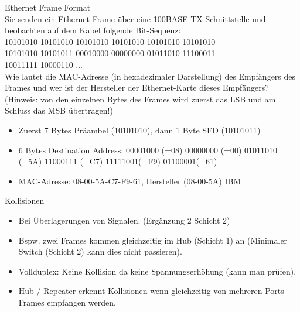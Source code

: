\begin{example2}{Ethernet Frame Format}\\
    Sie senden ein Ethernet Frame über eine 100BASE-TX Schnittstelle und beobachten auf dem Kabel folgende Bit-Sequenz:\\
    10101010 10101010 10101010 10101010 10101010 10101010\\
    10101010 10101011 00010000 00000000 01011010 11100011\\
    10011111 10000110 ...\\
    Wie lautet die MAC-Adresse (in hexadezimaler Darstellung) des Empfängers des Frames und
    wer ist der Hersteller der Ethernet-Karte dieses Empfängers?
    (Hinweis: von den einzelnen Bytes des Frames wird zuerst das LSB und am Schluss das
    MSB übertragen!)
    \begin{itemize}
        \item Zuerst 7 Bytes Präambel (10101010), dann 1 Byte SFD (10101011)
        \item 6 Bytes Destination Address: 00001000 (=08) 00000000 (=00) 01011010 (=5A) 11000111 (=C7) 11111001(=F9) 01100001(=61)
        \item MAC-Adresse: 08-00-5A-C7-F9-61, Hersteller (08-00-5A) IBM
    \end{itemize}
\end{example2}

\begin{definition}{Kollisionen}
    \begin{itemize}
        \item Bei Überlagerungen von Signalen. (Ergänzung 2 Schicht 2)
        \item Bspw. zwei Frames kommen gleichzeitig im Hub (Schicht 1) an (Minimaler Switch (Schicht 2) kann dies nicht passieren).
        \item Vollduplex: Keine Kollision da keine Spannungserhöhung (kann man prüfen).
        \item Hub / Repeater erkennt Kollisionen wenn gleichzeitig von mehreren Ports Frames empfangen werden.
    \end{itemize}
\end{definition}

